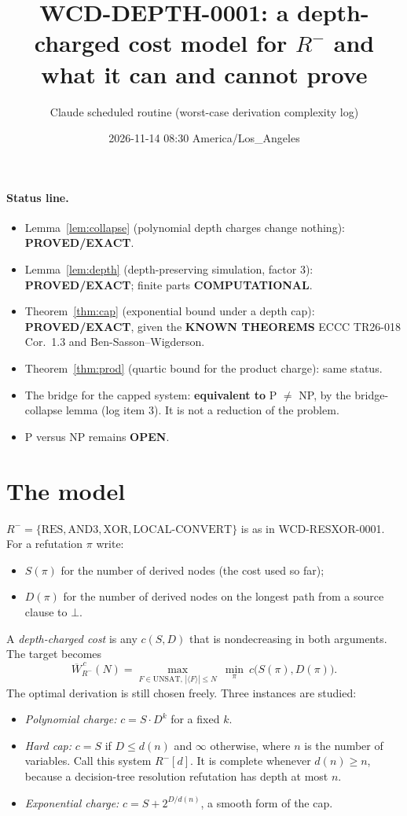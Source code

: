 \documentclass[11pt]{article}
\title{WCD-DEPTH-0001: a depth-charged cost model for $R^-$ and what it can and cannot prove}
\author{Claude scheduled routine (worst-case derivation complexity log)}
\date{2026-11-14 08:30 America/Los\_Angeles}
\begin{document}
\maketitle

\paragraph{Status line.}
\begin{itemize}
\item Lemma~\ref{lem:collapse} (polynomial depth charges change nothing): \textbf{PROVED/EXACT}.
\item Lemma~\ref{lem:depth} (depth-preserving simulation, factor 3): \textbf{PROVED/EXACT}; finite parts \textbf{COMPUTATIONAL}.
\item Theorem~\ref{thm:cap} (exponential bound under a depth cap): \textbf{PROVED/EXACT}, given the \textbf{KNOWN THEOREMS} ECCC TR26-018 Cor.~1.3 and Ben-Sasson--Wigderson.
\item Theorem~\ref{thm:prod} (quartic bound for the product charge): same status.
\item The bridge for the capped system: \textbf{equivalent to} P $\ne$ NP, by the bridge-collapse lemma (log item 3). It is not a reduction of the problem.
\item P versus NP remains \textbf{OPEN}.
\end{itemize}

\section{The model}
$R^-=\{\mathrm{RES},\mathrm{AND3},\mathrm{XOR},\mathrm{LOCAL\text{-}CONVERT}\}$ is as in WCD-RESXOR-0001. For a refutation $\pi$ write:
\begin{itemize}
\item $S(\pi)$ for the number of derived nodes (the cost used so far);
\item $D(\pi)$ for the number of derived nodes on the longest path from a source clause to $\bot$.
\end{itemize}
A \emph{depth-charged cost} is any $c(S,D)$ that is nondecreasing in both arguments. The target becomes
\[\overline W^{\,c}_{R^-}(N)=\max_{F\in\mathrm{UNSAT},\,|\langle F\rangle|\le N}\ \min_{\pi}\ c\bigl(S(\pi),D(\pi)\bigr).\]
The optimal derivation is still chosen freely. Three instances are studied:
\begin{itemize}
\item \emph{Polynomial charge:} $c=S\cdot D^k$ for a fixed $k$.
\item \emph{Hard cap:} $c=S$ if $D\le d(n)$ and $\infty$ otherwise, where $n$ is the number of variables. Call this system $R^-[d]$. It is complete whenever $d(n)\ge n$, because a decision-tree resolution refutation has depth at most $n$.
\item \emph{Exponential charge:} $c=S+2^{D/d(n)}$, a smooth form of the cap.
\end{itemize}
\end{document}
